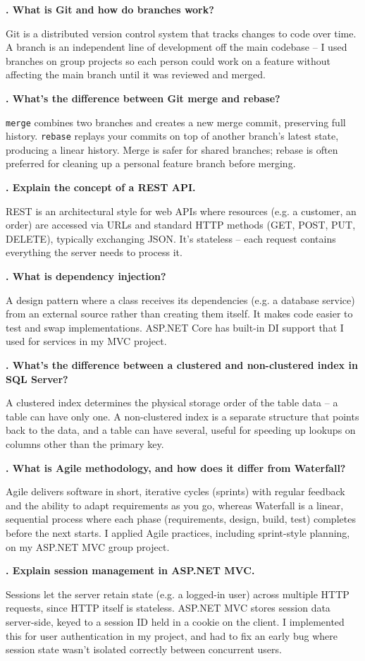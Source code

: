 \documentclass[10.5pt]{article}
\newcounter{qnum}
\newcommand{\qa}[2]{%
  \stepcounter{qnum}%
  \textbf{\theqnum. #1}\par
  #2\par
  \vspace{6pt}
}
\begin{document}
\qa{What is Git and how do branches work?}{Git is a distributed version control system that tracks changes to code over time. A branch is an independent line of development off the main codebase -- I used branches on group projects so each person could work on a feature without affecting the main branch until it was reviewed and merged.}

\qa{What's the difference between Git merge and rebase?}{\texttt{merge} combines two branches and creates a new merge commit, preserving full history. \texttt{rebase} replays your commits on top of another branch's latest state, producing a linear history. Merge is safer for shared branches; rebase is often preferred for cleaning up a personal feature branch before merging.}

\qa{Explain the concept of a REST API.}{REST is an architectural style for web APIs where resources (e.g. a customer, an order) are accessed via URLs and standard HTTP methods (GET, POST, PUT, DELETE), typically exchanging JSON. It's stateless -- each request contains everything the server needs to process it.}

\qa{What is dependency injection?}{A design pattern where a class receives its dependencies (e.g. a database service) from an external source rather than creating them itself. It makes code easier to test and swap implementations. ASP.NET Core has built-in DI support that I used for services in my MVC project.}

\qa{What's the difference between a clustered and non-clustered index in SQL Server?}{A clustered index determines the physical storage order of the table data -- a table can have only one. A non-clustered index is a separate structure that points back to the data, and a table can have several, useful for speeding up lookups on columns other than the primary key.}

\qa{What is Agile methodology, and how does it differ from Waterfall?}{Agile delivers software in short, iterative cycles (sprints) with regular feedback and the ability to adapt requirements as you go, whereas Waterfall is a linear, sequential process where each phase (requirements, design, build, test) completes before the next starts. I applied Agile practices, including sprint-style planning, on my ASP.NET MVC group project.}

\qa{Explain session management in ASP.NET MVC.}{Sessions let the server retain state (e.g. a logged-in user) across multiple HTTP requests, since HTTP itself is stateless. ASP.NET MVC stores session data server-side, keyed to a session ID held in a cookie on the client. I implemented this for user authentication in my project, and had to fix an early bug where session state wasn't isolated correctly between concurrent users.}
\end{document}
